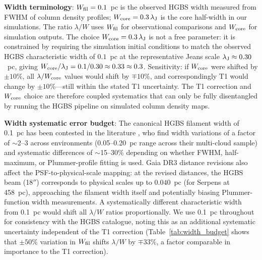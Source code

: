 \documentclass[twoside,twocolumn]{mnras}
\begin{document}
\textbf{Width terminology}: $W_{\rm fil} = 0.1$~pc is the observed HGBS width measured
from FWHM of column density profiles; $W_{\rm core} = 0.3\,\lambda_{\rm J}$ is the
core half-width in our simulations. The ratio $\lambda/W$ uses $W_{\rm fil}$ for observational comparisons and $W_{\rm core}$ for simulation outputs. The choice $W_{\rm core} = 0.3\,\lambda_{\rm J}$ is not a free parameter: it is constrained by requiring the simulation initial conditions to match the observed HGBS characteristic width of $0.1$~pc at the representative Jeans scale $\lambda_{\rm J} \approx 0.30$~pc, giving $W_{\rm core}/\lambda_{\rm J} = 0.1/0.30 \approx 0.33 \approx 0.3$. Sensitivity: if $W_{\rm core}$ were shifted by $\pm 10\%$, all $\lambda/W_{\rm core}$ values would shift by $\mp 10\%$, and correspondingly T1 would change by $\pm 10\%$---still within the stated T1 uncertainty. The T1 correction and $W_{\rm core}$ choice are therefore coupled systematics that can only be fully disentangled by running the HGBS pipeline on simulated column density maps.

\textbf{Width systematic error budget}: The canonical HGBS filament width of 0.1~pc has been
contested in the literature \citep{Panopoulou2022}, who find width variations of a factor of $\sim$2--3 across environments (0.05--0.20~pc range across their multi-cloud sample) and systematic differences of $\sim$15--30\% depending on whether FWHM, half-maximum, or Plummer-profile fitting is used. Gaia DR3 distance revisions also affect the PSF-to-physical-scale
mapping: at the revised distances, the HGBS beam (18$''$) corresponds to physical scales
up to $0.040$~pc (for Serpens at 458~pc), approaching the filament width itself and
potentially biasing Plummer-function width measurements. A systematically different
characteristic width from 0.1~pc would shift all $\lambda/W$ ratios proportionally.
We use 0.1~pc throughout for consistency with the HGBS catalogue, noting this as an
additional systematic uncertainty independent of the T1 correction
(Table~\ref{tab:width_budget} shows that $\pm 50\%$ variation in $W_{\rm fil}$ shifts
$\lambda/W$ by $\mp 33\%$, a factor comparable in importance to the T1 correction).
\end{document}
